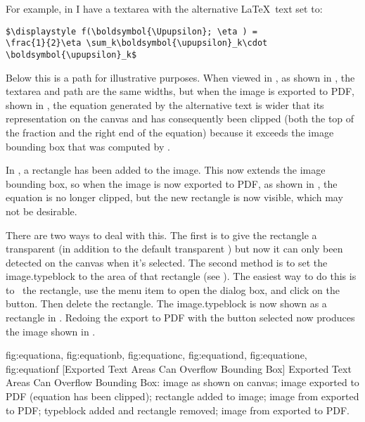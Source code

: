 For example, in  I have a \gls{textarea} with the
alternative \LaTeX\ text set to:
\begin{verbatim}
$\displaystyle f(\boldsymbol{\Upupsilon}; \eta ) = 
\frac{1}{2}\eta \sum_k\boldsymbol{\upupsilon}_k\cdot 
\boldsymbol{\upupsilon}_k$
\end{verbatim}
Below this is a \gls{path} for illustrative purposes. When viewed in
\FlowframTk, as shown in , the
\gls*{textarea} and \gls*{path} are the same widths, but when the
image is exported to PDF, shown in , the
equation generated by the alternative text is wider that its
representation on the \gls{canvas} and has consequently been clipped
(both the top of the fraction and the right end of the equation)
because it exceeds the image bounding box that was computed by
\FlowframTk.

In , a rectangle has been
added to the image. This now extends the image bounding box, so when
the image is now exported to PDF, as shown in
, the equation is no longer clipped,
but the new rectangle is now visible, which may not be desirable.

There are two ways to deal with this. The first is to give the
rectangle a \gls{transparent}  (in addition to the
default \gls{transparent} ) but now it can only been detected on the
\gls{canvas} when it's selected. The second method is to set the
\gls{image.typeblock} to the area of that rectangle (see ).
The easiest way to do this is to \select\ the rectangle, use the
 menu item to open the
 dialog box, and click on the
 button. Then delete the
rectangle. The \gls{image.typeblock} is now shown as a  rectangle in
. Redoing the export to PDF with the
 button selected now
produces the image shown in .

{
 {fig:equationa}{}{},
 {fig:equationb}{}{},
 {fig:equationc}{}{},
 {fig:equationd}{}{},
 {fig:equatione}{}{},
 {fig:equationf}{}{}
}
[Exported Text Areas Can Overflow Bounding Box]
{Exported Text Areas Can Overflow Bounding Box:
 image as shown on canvas;
 image exported to PDF (equation has been clipped);
 rectangle added to image;
 image from  exported to PDF;
 typeblock added and rectangle removed;
 image from  exported to PDF.}

